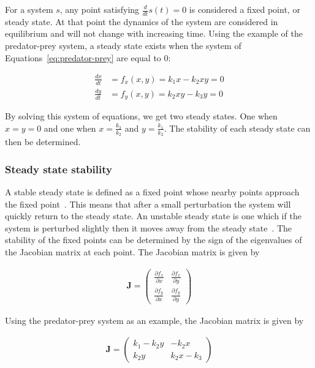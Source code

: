 For a system $s$, any point satisfying $\frac{d}{dt}s(t) = 0$ is considered a fixed point, or steady state. At that point the dynamics of the system are considered in equilibrium and will not change with increasing time. Using the example of the predator-prey system, a steady state exists when the system of Equations~\ref{eq:predator-prey} are equal to 0: 
 
\begin{align}
\frac{dx}{dt} &= f_x(x,y) = k_{1}x - k_{2}xy = 0\\
\frac{dy}{dt} &= f_y(x,y) = k_{2}xy - k_{3}y = 0
\end{align}

By solving this system of equations, we get two steady states. One when $x = y = 0$ and one when $x = \frac{k_3}{k_2}$ and $y = \frac{k_1}{k_2}$. The stability of each steady state can then be determined.

\subsubsection{Steady state stability} 

A stable steady state is defined as a fixed point whose nearby points approach the fixed point~\autocite{kaplan:1959}. This means that after a small perturbation the system will quickly return to the steady state. An unstable steady state is one which if the system is perturbed slightly then it moves away from the steady state~\autocite{konopka:2007}. The stability of the fixed points can be determined by the sign of the eigenvalues of the Jacobian matrix at each point. The Jacobian matrix is given by 

\begin{align}
\textbf{J} = \begin{pmatrix}
	\frac{\partial f_x}{\partial x} & \frac{\partial f_x}{\partial y}\\
	\frac{\partial f_y}{\partial x} & \frac{\partial f_y}{\partial y}	
\end{pmatrix}
\end{align}


\noindent Using the predator-prey system as an example, the Jacobian matrix is given by

\begin{align}
\textbf{J} = \begin{pmatrix}
	k_1 - k_{2}y & -k_{2}x\\
	k_{2}y & k_{2}x - k_3 
\end{pmatrix}
\end{align}

